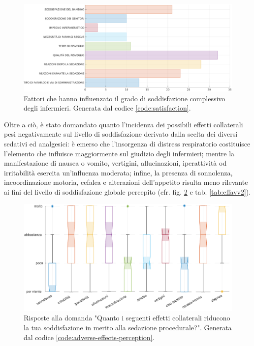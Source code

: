 \begin{figure}[!h]
    \centering
    \includegraphics[width=1\textwidth]{Figure/soddisfazione-globale.eps}
    \caption{Fattori che hanno influenzato il grado di soddisfazione complessivo degli infermieri. Generata dal codice \ref{code:satisfaction}.}
    \label{fig:soddglobale}
\end{figure}

\newpage
Oltre a ciò, è stato domandato quanto l'incidenza dei possibili effetti collaterali pesi negativamente sul livello di soddisfazione derivato dalla scelta dei diversi sedativi ed analgesici: è emerso che l'insorgenza di distress respiratorio costituisce l'elemento che influisce maggiormente sul giudizio degli infermieri; mentre la manifestazione di nausea o vomito, vertigini, allucinazioni, iperattività od irritabilità esercita un'influenza moderata; infine, la presenza di sonnolenza, incoordinazione motoria, cefalea e alterazioni dell'appetito risulta meno rilevante ai fini del livello di soddisfazione globale percepito (cfr. fig. \ref{fig:influenzaeffetti} e tab. \ref{tab:effavv2}). 

\vfill

\begin{figure}[!ht]
    \centering
    \includegraphics[width=1\textwidth]{Figure/influenza-effetti.pdf}
    \caption{Risposte alla domanda "Quanto i seguenti effetti collaterali riducono la tua soddisfazione in merito alla sedazione procedurale?". Generata dal codice \ref{code:adverse-effects-perception}.}
    \label{fig:influenzaeffetti}
\end{figure}

